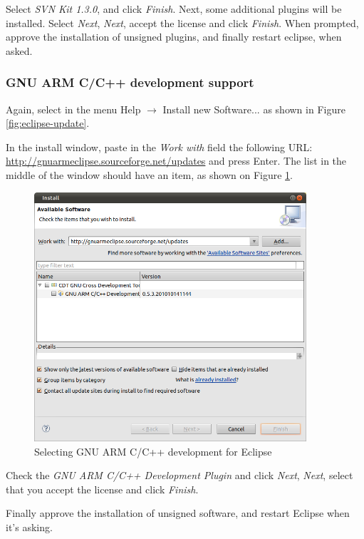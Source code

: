 \documentclass[a4paper, 10pt]{article}
\begin{document}
Select \emph{SVN Kit 1.3.0}, and click \emph{Finish}. Next, some additional plugins
will be installed.
Select \emph{Next},
\emph{Next}, accept the license and click \emph{Finish}.
When prompted, approve the installation of unsigned plugins,
and finally restart eclipse, when asked.


\subsubsection{GNU ARM C/C++ development support}

Again, select in the menu Help $\rightarrow$ Install new Software... as shown in
Figure \ref{fig:eclipse-update}.

In the install window, paste in the \emph{Work with} field
the following URL:
\url{http://gnuarmeclipse.sourceforge.net/updates} and press Enter.
The list in the middle of the window should have an item, as shown on
Figure \ref{fig:eclipse-gnu-arm}.

    \begin{figure}[H]
    \centering
        \includegraphics[width=0.9\textwidth]{./install-guide-linux-images/eclipse-gnu-arm.png}
        \caption{Selecting GNU ARM C/C++ development for Eclipse}
        \label{fig:eclipse-gnu-arm}
    \end{figure}

Check the \emph{GNU ARM C/C++ Development Plugin} and click \emph{Next},
\emph{Next}, select that you accept the license and click \emph{Finish}.

Finally approve the installation of unsigned software,
and restart Eclipse when it's asking.
\end{document}
